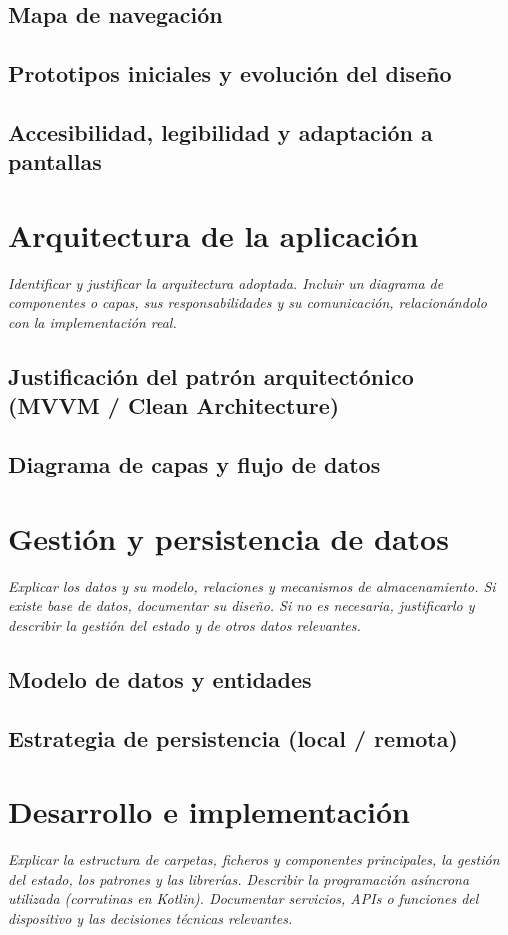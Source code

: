 \documentclass[11pt,a4paper]{article}
\begin{document}
\subsection{Mapa de navegación}
\subsection{Prototipos iniciales y evolución del diseño}
\subsection{Accesibilidad, legibilidad y adaptación a pantallas}

\section{Arquitectura de la aplicación}
\textit{Identificar y justificar la arquitectura adoptada. Incluir un diagrama de componentes o capas, sus responsabilidades y su comunicación, relacionándolo con la implementación real.}

\subsection{Justificación del patrón arquitectónico (MVVM / Clean Architecture)}
\subsection{Diagrama de capas y flujo de datos}

\section{Gestión y persistencia de datos}
\textit{Explicar los datos y su modelo, relaciones y mecanismos de almacenamiento. Si existe base de datos, documentar su diseño. Si no es necesaria, justificarlo y describir la gestión del estado y de otros datos relevantes.}

\subsection{Modelo de datos y entidades}
\subsection{Estrategia de persistencia (local / remota)}

\section{Desarrollo e implementación}
\textit{Explicar la estructura de carpetas, ficheros y componentes principales, la gestión del estado, los patrones y las librerías. Describir la programación asíncrona utilizada (corrutinas en Kotlin). Documentar servicios, APIs o funciones del dispositivo y las decisiones técnicas relevantes.}
\end{document}
